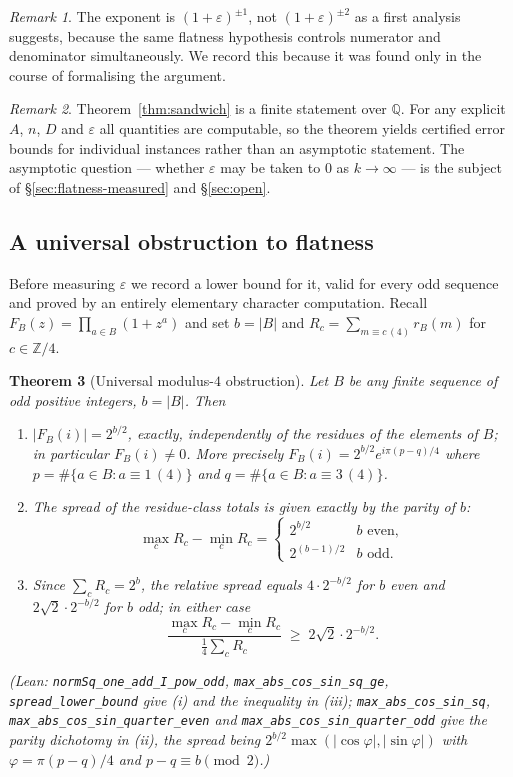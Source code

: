 \documentclass[11pt,a4paper]{article}
\theoremstyle{plain}
\newtheorem{theorem}{Theorem}[section]
\theoremstyle{definition}
\theoremstyle{remark}
\newtheorem{remark}[theorem]{Remark}
\newcommand{\Lean}[1]{\texttt{#1}}
\begin{document}
\begin{remark}
The exponent is $(1+\varepsilon)^{\pm1}$, not $(1+\varepsilon)^{\pm2}$ as a
first analysis suggests, because the same flatness hypothesis controls numerator
and denominator simultaneously. We record this because it was found only in the
course of formalising the argument.
\end{remark}

\begin{remark}
Theorem~\ref{thm:sandwich} is a finite statement over $\mathbb{Q}$. For any
explicit $A$, $n$, $D$ and $\varepsilon$ all quantities are computable, so the
theorem yields certified error bounds for individual instances rather than an
asymptotic statement. The asymptotic question --- whether $\varepsilon$ may be
taken to $0$ as $k\to\infty$ --- is the subject of
\S\ref{sec:flatness-measured} and \S\ref{sec:open}.
\end{remark}

\subsection{A universal obstruction to flatness}\label{sec:floor}

Before measuring $\varepsilon$ we record a lower bound for it, valid for every
odd sequence and proved by an entirely elementary character computation. Recall
$F_B(z)=\prod_{a\in B}(1+z^{a})$ and set $b=|B|$ and
$R_c=\sum_{m\equiv c\,(4)}r_B(m)$ for $c\in\mathbb{Z}/4$.

\begin{theorem}[Universal modulus-$4$ obstruction]\label{thm:floor}
Let $B$ be any finite sequence of odd positive integers, $b=|B|$. Then
\begin{enumerate}
\item $|F_B(i)|=2^{b/2}$, exactly, independently of the residues of the elements
      of $B$; in particular $F_B(i)\ne0$. More precisely
      $F_B(i)=2^{b/2}e^{i\pi(p-q)/4}$ where $p=\#\{a\in B:a\equiv1\,(4)\}$ and
      $q=\#\{a\in B:a\equiv3\,(4)\}$.
\item The spread of the residue-class totals is given \emph{exactly} by the
      parity of $b$:
      \[
        \max_c R_c-\min_c R_c=
        \begin{cases} 2^{b/2} & b \text{ even},\\[2pt] 2^{(b-1)/2} & b \text{ odd}.\end{cases}
      \]
\item Since $\sum_c R_c=2^{b}$, the relative spread equals $4\cdot2^{-b/2}$ for
      $b$ even and $2\sqrt2\cdot2^{-b/2}$ for $b$ odd; in either case
      \[
        \frac{\max_c R_c-\min_c R_c}{\frac14\sum_c R_c}\;\ge\;2\sqrt2\cdot2^{-b/2}.
      \]
\end{enumerate}
\textup{(Lean: \Lean{normSq\_one\_add\_I\_pow\_odd}, \Lean{max\_abs\_cos\_sin\_sq\_ge},
\Lean{spread\_lower\_bound} give (i) and the inequality in (iii);
\Lean{max\_abs\_cos\_sin\_sq}, \Lean{max\_abs\_cos\_sin\_quarter\_even} and
\Lean{max\_abs\_cos\_sin\_quarter\_odd} give the parity dichotomy in (ii), the
spread being $2^{b/2}\max(|\cos\varphi|,|\sin\varphi|)$ with
$\varphi=\pi(p-q)/4$ and $p-q\equiv b\pmod 2$.)}
\end{theorem}
\end{document}
